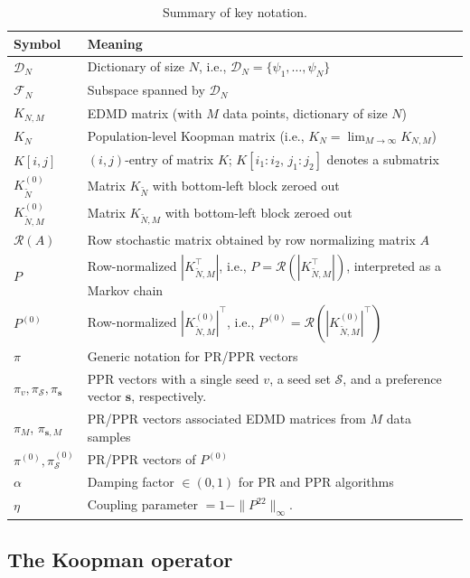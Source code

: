 \documentclass{article}
\theoremstyle{plain}
\theoremstyle{definition}
\def\tp{\intercal}
\def\Fc{\mathcal{F}}
\def\Dc{\mathcal{D}}
\newcommand{\arXivtag}[1][]{#1}
\begin{document}
\begin{table}[h]
	\centering
	\caption{Summary of key notation.}
	\label{tab:notation}
	\small
	\begin{tabular}{ll}
		\hline
		Symbol & Meaning \\
		\hline
		$\Dc_{N}$ & Dictionary of size $N$, i.e., $\Dc_{N} = \{\psi_1, \ldots, \psi_N\}$ \\ 
		$\Fc_{N}$ & Subspace spanned by $\Dc_{N}$ \\ 
		$K_{N,M}$ & EDMD matrix (with $M$ data points, dictionary of size $N$) \\
		$K_N$ & \arXivtag[Population-level Koopman matrix (i.e., $K_N=\lim_{M\to \infty}K_{N,M}$)] \\
		$K[i,j]$ & $(i,j)$-entry of matrix $K$; $K[i_1:i_2,\, j_1:j_2]$ denotes a submatrix \\
		$K_{\tilde{N}}^{(0)}$ &  Matrix $K_{\tilde{N}}$ with bottom-left block zeroed out \\
		$K_{\tilde{N},M}^{(0)}$ &  Matrix $K_{\tilde{N},M}$ with bottom-left block zeroed out \\
		$\mathcal{R}(A)$ & Row stochastic matrix obtained by row normalizing matrix $A$ \\ 
		$P$ &  Row-normalized $|K_{\tilde N,M}^{\tp}|$, i.e., \arXivtag[$P=\mathcal{R}(|K_{\tilde N,M}^{\tp}|)$], interpreted as a Markov chain \\
		$P^{(0)}$ &  Row-normalized $|K^{(0)}_{\tilde N,M}|^{\tp}$, i.e., $P^{(0)} = \mathcal{R}(|K^{(0)}_{\tilde N,M}|^{\tp})$ \\
		$\pi$ & Generic notation for \arXivtag[PR/PPR] vectors \\
		$\pi_{v}, \pi_{\mathcal{S}}, {\pi}_{\mathbf{s}}$ & PPR vectors with a single seed $v$, a seed set $\mathcal{S}$, and a preference vector $\mathbf{s}$, respectively. \\
		$\pi_M$, $\pi_{\mathbf{s}, M}$ & PR/PPR vectors associated EDMD matrices from $M$ data samples \\ 
		$\pi^{(0)}, \pi_{\mathcal{S}}^{(0)}$ & PR/PPR vectors of $P^{(0)}$ \\
		$\alpha$ & Damping factor $\in (0,1)$ for PR and PPR algorithms\\
		$\eta$ & Coupling parameter $= 1 - \|P^{22}\|_\infty.$ \\
		\hline
	\end{tabular}
\end{table}


\subsection{The Koopman operator}
\end{document}
